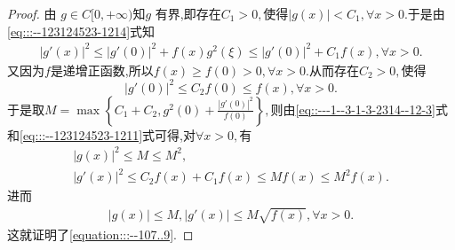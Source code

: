 \documentclass[../../main.tex]{subfiles}
\begin{document}
\begin{proof}
由 \( g\in C[0,+\infty) \)知$g$ 有界,即存在$C_1>0,$使得$|g(x)|<C_1,\forall x>0.$于是由\eqref{eq:::--123124523-1214}式知
\begin{align}
\left| g' (x) \right|^2\leqslant \left| g' (0) \right|^2+f(x)g^2(\xi )\leqslant \left| g' (0) \right|^2+C_1f(x),\forall x>0.\label{eq::---1--3-1-3-2314--12-3}
\end{align}
又因为$f$是递增正函数,所以$f(x)\geqslant f(0)>0,\forall x>0.$从而存在$C_2>0,$使得
$$
|g'(0)|^2\leqslant C_2f(0)\leqslant f(x),\forall x>0.
$$
于是取$M=\max \left\{ C_1+C_2,g^2(0)+\frac{\left| g' (0) \right|^2}{f(0)} \right\},$则由\eqref{eq::---1--3-1-3-2314--12-3}式和\eqref{eq:::--123124523-1211}式可得,对$\forall x>0,$有
\begin{gather*}
\left| g\left( x \right) \right|^2\leqslant M\leqslant M^2,
\\
\left| g' (x) \right|^2\leqslant C_2f\left( x \right) +C_1f(x)\leqslant Mf\left( x \right) \leqslant M^2f\left( x \right) .
\end{gather*}
进而
\begin{align*}
\left| g\left( x \right) \right|\leqslant M,\left| g'(x) \right|\leqslant M\sqrt{f\left( x \right)},\forall x>0.
\end{align*}
这就证明了\eqref{equation:::--107..9}.

\end{proof}
\end{document}
